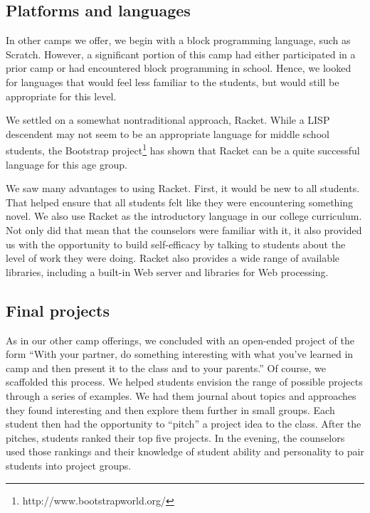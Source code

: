\subsection{Platforms and languages}

In other camps we offer, we begin with a block programming language,
such as Scratch.  However, a significant portion of this camp had
either participated in a prior camp or had encountered block
programming in school.  Hence, we looked for languages that would
feel less familiar to the students, but would still be appropriate
for this level.

We settled on a somewhat nontraditional approach, Racket.  While a
LISP descendent may not seem to be an appropriate language for
middle school students, the Bootstrap
project\footnote{http://www.bootstrapworld.org/} has shown that
Racket can be a quite successful language for this age group.

We saw many advantages to using Racket.  First, it would be new to
all students.  That helped ensure that all students felt like they
were encountering something novel.  We also use Racket as the
introductory language in our college curriculum.  Not only did that
mean that the counselors were familiar with it, it also provided
us with the opportunity to build self-efficacy by talking to students
about the level of work they were doing.  Racket also provides a
wide range of available libraries, including a built-in Web server
and libraries for Web processing.  

\subsection{Final projects}

As in our other camp offerings, we concluded with an open-ended
project of the form ``With your partner, do something interesting
with what you've learned in camp and then present it to the class
and to your parents.'' Of course, we scaffolded this process.  We
helped students envision the range of possible projects through a
series of examples.  We had them journal about topics and approaches
they found interesting and then explore them further in small groups.
Each student then had the opportunity to ``pitch'' a project idea
to the class.  After the pitches, students ranked their top five
projects.  In the evening, the counselors used those rankings and
their knowledge of student ability and personality to pair students
into project groups.

